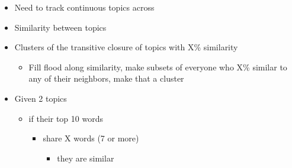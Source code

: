 \documentclass[titlepage,usenames,a4,landscape,semhelv]{seminar}
\begin{document}
\begin{slide}
\begin{itemize}
\begin{itemize}
\end{itemize}
\end{itemize}
\begin{itemize}
\item Need to track continuous topics across 
\item Similarity between topics
\item Clusters of the transitive closure of topics with X\% similarity
	\begin{itemize}
	\item Fill flood along similarity, make subsets of everyone who X\% similar to any of their neighbors, make that a cluster




\end{itemize}
\end{itemize}
\begin{itemize}
\item Given 2 topics
	\begin{itemize}
	\item if their top 10 words 
		\begin{itemize}
		\item share X words (7 or more)
			\begin{itemize}
			\item they are similar







\newslide


\end{itemize}
\end{itemize}
\end{itemize}
\end{itemize}
\end{slide}
\end{document}
